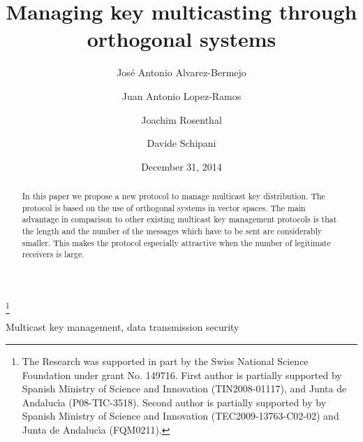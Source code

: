 \documentclass[a4paper,11pt]{amsart}
\theoremstyle{definition}
\begin{document}
\title{Managing key multicasting 
  through orthogonal systems  }

\thanks{The Research was supported in part by the Swiss National Science
Foundation under grant No. 149716. First author is partially supported
by Spanish Ministry of Science and Innovation (TIN2008-01117), and
Junta de Andaluc\'{\i}a (P08-TIC-3518).  Second author is partially
supported by by Spanish Ministry of Science and Innovation
(TEC2009-13763-C02-02) and Junta de Andaluc\'{\i}a (FQM0211). }

\author{Jos\'e Antonio  Alvarez-Bermejo}
\address[Jos\'e Antonio  Alvarez-Bermejo]{Departamento de \'Algebra y An\'alisis Matem\'atico
Universidad de Almer\'ia
04120 Almer\'ia, Spain}

\author{Juan Antonio Lopez-Ramos}
\address[Juan Antonio Lopez-Ramos]{Departamento de \'Algebra y An\'alisis Matem\'atico
Universidad de Almer\'ia
04120 Almer\'ia, Spain}

\author{Joachim Rosenthal}
\address[Joachim Rosenthal]{Mathematics Institute, University of Zurich, 
CH-8057 Zurich,  Switzerland}

\author{Davide Schipani}
\address[Davide Schipani]{Mathematics Institute, University of Zurich, 
CH-8057 Zurich,  Switzerland}



\date{December 31, 2014}


\thispagestyle{empty}



\begin{abstract}
  In this paper we propose a new protocol to manage multicast key
  distribution. The protocol is based on the use of orthogonal systems
  in vector spaces.  The main advantage in comparison to other existing
  multicast key management protocols is that the length and the number
  of the messages which have to be sent are considerably smaller. This
  makes the protocol especially attractive when the number of legitimate
  receivers is large.
\end{abstract}
\maketitle


\vspace{2mm}
 Multicast key management, data transmission
security
\end{document}
